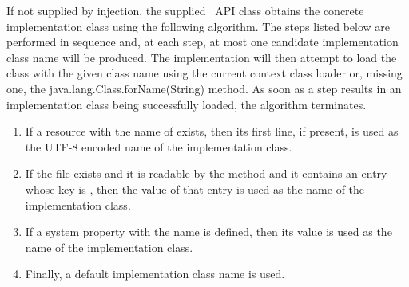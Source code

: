 If not supplied by injection, the supplied \rd\ API class obtains the concrete implementation class using the following algorithm. The steps listed below 
are performed in sequence and, at each step, at most one candidate implementation class name will be produced. The implementation will then attempt to load the class with the given class name using the current context class loader or, missing one, the java.lang.Class.forName(String) method. As soon as a step results in an implementation class being successfully loaded, the algorithm terminates.
\begin{enumerate}
\item If a resource with the name of  exists, then its first line, if present, is used as the UTF-8 encoded name of the implementation class. 
\item If the  file exists and it is readable by the  method and it contains an entry whose key is , then the value of that entry is used as the name of the implementation class. 
\item If a system property with the name  is defined, then its value is used as the name of the implementation class. 
\item Finally, a default implementation class name is used. 
\end{enumerate}